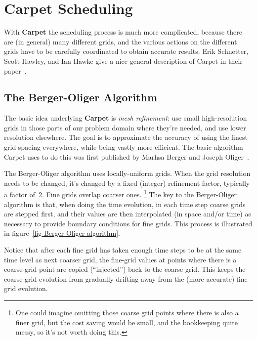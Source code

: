 \documentclass{article}
\def\thorn#1{\textbf{#1}}
\begin{document}

\section{\thorn{Carpet} Scheduling}

With \thorn{Carpet} the scheduling process is much more complicated,
because there are (in general) many different grids, and the various
actions on the different grids have to be carefully coordinated to
obtain accurate results.  Erik Schnetter, Scott Hawley, and Ian Hawke
give a nice general description of Carpet in their
paper~\cite{Schnetter-etal-03b}.


\subsection{The Berger-Oliger Algorithm}
\label{sect-Berger-Oliger-algorithm}

The basic idea underlying \thorn{Carpet} is \emph{mesh refinement}:
use small high-resolution grids in those parts of our problem domain
where they're needed, and use lower resolution elsewhere.  The goal
is to approximate the accuracy of using the finest grid spacing
everywhere, while being vastly more efficient.  The basic algorithm
Carpet uses to do this was first published by Marhsa Berger and
Joseph Oliger~\cite{Berger-1982,Berger84,Berger86,Berger89,Berger91}.

The Berger-Oliger algorithm uses locally-uniform grids.  When the grid
resolution needs to be changed, it's changed by a fixed (integer)
refinement factor, typically a factor of~2.  Fine grids overlap
coarser ones.%
\footnote{%
	 One could imagine omitting those coarse grid
	 points where there is also a finer grid, but the
	 cost saving would be small, and the bookkeeping
	 quite messy, so it's not worth doing this.
	 }%
{}  The key to the Berger-Oliger algorithm is that, when doing the time
evolution, in each time step coarse grids are stepped first, and their
values are then interpolated (in space and/or time) as necessary to
provide boundary conditions for fine grids.  This process is illustrated
in figure~\ref{fig-Berger-Oliger-algorithm}.

Notice that after each fine grid has taken enough time steps to be
at the same time level as next coarser grid, the fine-grid values at
points where there is a coarse-grid point are copied (``injected'')
back to the coarse grid.  This keeps the coarse-grid evolution from
gradually drifting away from the (more accurate) fine-grid evolution.
\end{document}

